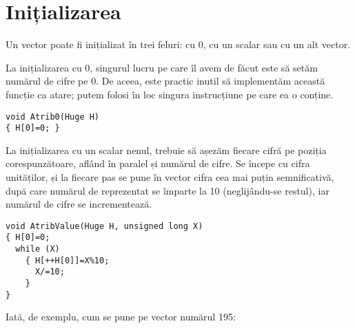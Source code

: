 \section{Inițializarea}

Un vector poate fi inițializat în trei feluri: cu 0, cu un scalar sau cu un
alt vector.

La inițializarea cu 0, singurul lucru pe care îl avem de făcut este să setăm
numărul de cifre pe 0. De aceea, este practic inutil să implementăm această
funcție ca atare; putem folosi în loc singura instrucțiune pe care ea o
conține.

\begin{verbatim}
void Atrib0(Huge H)
{ H[0]=0; }
\end{verbatim}

La inițializarea cu un scalar nenul, trebuie să așezăm fiecare cifră pe
poziția corespunzătoare, aflând în paralel și numărul de cifre. Se începe cu
cifra unităților, și la fiecare pas se pune în vector cifra cea mai puțin
semnificativă, după care numărul de reprezentat se împarte la 10
(neglijându-se restul), iar numărul de cifre se incrementează.

\begin{verbatim}
void AtribValue(Huge H, unsigned long X)
{ H[0]=0;
  while (X)
    { H[++H[0]]=X%10;
      X/=10;
    }
}
\end{verbatim}

Iată, de exemplu, cum se pune pe vector numărul 195:

